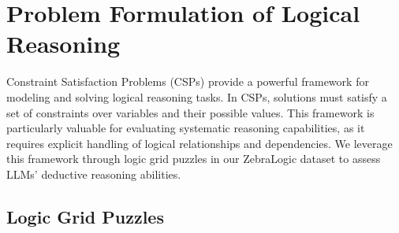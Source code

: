 





\vspace{-0.2cm}
\section{Problem Formulation of Logical Reasoning}
\label{sec:zebralogic}
\vspace{-0.2cm}
Constraint Satisfaction Problems (CSPs) provide a powerful framework for modeling and solving logical reasoning tasks. In CSPs, solutions must satisfy a set of constraints over variables and their possible values. 
This framework is particularly valuable for evaluating systematic reasoning capabilities, as it requires explicit handling of logical relationships and dependencies. We leverage this framework through logic grid puzzles in our ZebraLogic dataset to assess LLMs' deductive reasoning abilities.




\subsection{Logic Grid Puzzles}



